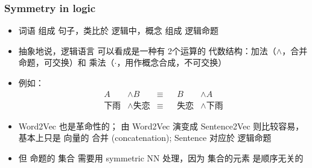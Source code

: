 \documentclass[16pt]{beamer}
\newcommand{\cc}[2]{#1}
\newcommand{\cc}[2]{#2}
\newcommand{\emp}[1]{{\color{violet}#1}}
\begin{document}
\begin{frame}
\frametitle{Symmetry in logic}
\begin{itemize}
	\item \cc{\emp{词语} 组成 \emp{句子}，类比於 逻辑中，\emp{概念} 组成 \emp{逻辑命题}}
	{\emp{Words} form \emp{sentences}, analogous to \emp{concepts} forming \emp{propositions} in logic}
	
	\item \cc{抽象地说，逻辑语言 可以看成是一种有 2个运算的 \emp{代数结构}：加法（$\wedge$，合并命题，可交换）和 乘法（$\cdot$，用作概念合成，不可交换）}
	{From an abstract point of view, logic can be seen as an \emp{algebra} with 2 operations: a non-commutative multiplication ($\cdot$, for composition of concepts) and a commutative addition ($\wedge$, for conjunction of propositions)}

	\item \cc{例如：}{For example:}
	\begin{equation}
	\begin{aligned}
	A &\wedge B & \equiv && B & \wedge A \\
	\mbox{\cc{下雨}{it's raining}} &\wedge \mbox{\cc{失恋}{lovesick}} & \equiv && \mbox{\cc{失恋}{lovesick}} &\wedge \mbox{\cc{下雨}{it's raining}}
	\end{aligned}
	\end{equation}

	\item \cc{Word2Vec 也是革命性的； 由 Word2Vec 演变成 Sentence2Vec 则比较容易，基本上只是 向量的 \emp{合并} (concatenation);  Sentence 对应於 逻辑命题}
	{Word2Vec was also ground-breaking, but it was easy to go from Word2Vec to Sentence2Vec: just concatenate the vectors
	\\ Sentences correspond to propositional logic}

	\item \cc{但 命题的 \emp{集合} 需要用 symmetric NN 处理，因为 集合的元素 是\emp{顺序无关}的}
	{A \emp{set} of propositions requires symmetric NN to process, as elements of the set are \emp{permutation invariant}}

	
	

\end{itemize}
\end{frame}
\end{document}

